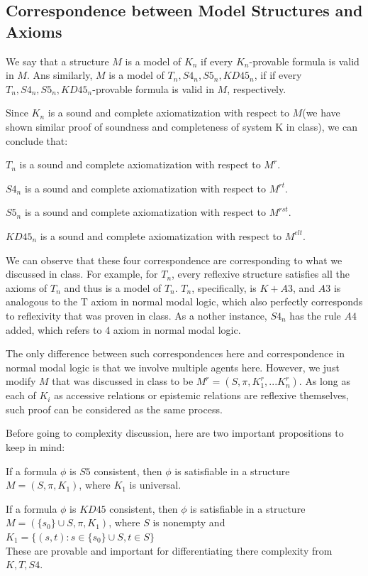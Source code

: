 \documentclass{article}
\begin{document}
\subsection{Correspondence between Model Structures and Axioms}
\par We say that a structure $M$ is a model of $K_n$ if every $K_n$-provable formula is valid in $M$. Ans similarly, $M$ is a model of $T_n, S4_n, S5_n, KD45_n$, if if every $T_n, S4_n, S5_n, KD45_n$-provable formula is valid in $M$, respectively. 
\par Since $K_n$ is a sound and complete axiomatization with respect to $M$(we have shown similar proof of soundness and completeness of system K in class), we can conclude that: \\
\par $T_n$ is a sound and complete axiomatization with respect to $M^r$.
\par $S4_n$ is a sound and complete axiomatization with respect to $M^{rt}$.
\par $S5_n$ is a sound and complete axiomatization with respect to $M^{rst}$.
\par $KD45_n$ is a sound and complete axiomatization with respect to $M^{elt}$.\\
\par We can observe that these four correspondence are corresponding to what we discussed in class. For example, for $T_n$, every reflexive structure satisfies all the axioms of $T_n$ and thus is a model of $T_n$. $T_n$, specifically, is $K+A3$, and $A3$ is analogous to the T axiom in normal modal logic, which also perfectly corresponds to reflexivity that was proven in class. As a nother instance, $S4_n$ has the rule $A4$ added, which refers to 4 axiom in normal modal logic. 
\par The only difference between such correspondences here and correspondence in normal modal logic is that we involve multiple agents here. However, we just modify $M$ that was discussed in class to be $M^r=(S,\pi,K_1^r,...K_n^r)$. As long as each of $K_i$ as accessive relations or epistemic relations are reflexive themselves, such proof can be considered as the same process. \\
\par Before going to complexity discussion, here are two important propositions to keep in mind: \\
\par If a formula $\phi$ is $S5$ consistent, then $\phi$ is satisfiable in a structure $M=(S,\pi,K_1)$, where $K_1$ is universal. 
\par If a formula $\phi$ is $KD45$ consistent, then $\phi$ is satisfiable in a structure $M=(\{s_0\}\cup S,\pi,K_1)$, where $S$ is nonempty and $K_1 = \{(s,t): s\in \{s_0\}\cup S, t\in S\}$ \\
These are provable and important for differentiating there complexity from $K,T,S4$.
\end{document}
